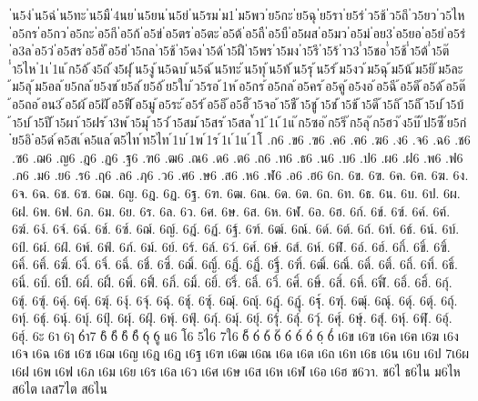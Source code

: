 {่น5ง่
่น5ฉ่
่น5ทะ
่น5มื
่4นย
่น5ยน
่น5ย่
่น5รม
่ม1
่ม5พว
่ย5กะ
่ย5ฉุ
่ย5รา
่ย5ร่
่ว5ช้
่ว5ถึ
่ว5ยว
่ว5ไห
่อ5กร
่อ5กว
่อ5กะ
่อ5กี
่อ5ก้
่อ5ข่
่อ5ตร
่อ5ตะ
่อ5ต้
่อ5ถื
่อ5บื
่อ5ผส
่อ5มว
่อ5ม่
่อย3
่อ5ยอ
่อ5ย่
่อ5ร่
่อ3ล
่อ5ว่
่อ5สร
่อ5ฮั
่อ5ฮ่
่า5กล
่า5ช้
่า5ดง
่า5ด้
่า5ฝื
่า5พร
่า5มง
่า5รึ
่า5ร้
่าว3
่ำ5ชอ
่ำ5ช้
่ำ5ต้
่ำ5ต๊
่ำ5ไห
่1เ
่1แ
้ก5อ้
้ง5ถ่
้ง5ฝุ
้น5งู
้น5ฉบ
้น5ฉ่
้น5ทะ
้น5ทุ
้น5ท้
้น5รุ
้น5ร่
้ม5งว
้ม5ฉุ
้ม5น้
้ม5ยิ
้ม5ละ
้ม5ลุ
้ม5อล
้ย5กล
้ย5งช
้ย5ล่
้ย5อ้
้ย5ใบ
้ว5รอ
้1ห
้อ5กร
้อ5กล
้อ5คร
้อ5คู
้อ5งอ
้อ5ฉี
้อ5ดึ
้อ5ด้
้อ5ต๊
้อ5ถอ
้อน3
้อ5ผ้
้อ5ฝั
้อ5ฟื
้อ5มู
้อ5ระ
้อ5ร่
้อ5อึ
้อ5ฮื
้า5จอ
้า5ชื
้า5ชู
้า5ช่
้า5ช้
้า5ดี
้า5ถิ
้า5ถึ
้า5บ่
้า5บ้
้า5บ๋
้า5ปี
้า5ผา
้า5ฝร
้า3พ
้า5มุ
้า5ว่
้า5สม
้า5สร
้า5สล
้ำ1
้1เ
้1แ
๊ก5ซอ
๊ก5ริ
๊ก5ลุ
๊ก5ฮว
๊ง5บ๊
๊ป5ซี
๊ย5ก่
๋ย5อิ
๋อ5ด๋
์ค5สเ
์ค5แล
์ต5ไท
์ท5ไท
์1บ
์1พ
์1ร
์1เ
์1แ
์1โ
.ก6
.ข6
.ฃ6
.ค6
.ฅ6
.ฆ6
.ง6
.จ6
.ฉ6
.ช6
.ซ6
.ฌ6
.ญ6
.ฎ6
.ฏ6
.ฐ6
.ฑ6
.ฒ6
.ณ6
.ด6
.ต6
.ถ6
.ท6
.ธ6
.น6
.บ6
.ป6
.ผ6
.ฝ6
.พ6
.ฟ6
.ภ6
.ม6
.ย6
.ร6
.ฤ6
.ล6
.ฦ6
.ว6
.ศ6
.ษ6
.ส6
.ห6
.ฬ6
.อ6
.ฮ6
6ก.
6ข.
6ฃ.
6ค.
6ฅ.
6ฆ.
6ง.
6จ.
6ฉ.
6ช.
6ซ.
6ฌ.
6ญ.
6ฎ.
6ฏ.
6ฐ.
6ฑ.
6ฒ.
6ณ.
6ด.
6ต.
6ถ.
6ท.
6ธ.
6น.
6บ.
6ป.
6ผ.
6ฝ.
6พ.
6ฟ.
6ภ.
6ม.
6ย.
6ร.
6ล.
6ว.
6ศ.
6ษ.
6ส.
6ห.
6ฬ.
6อ.
6ฮ.
6ก์.
6ข์.
6ฃ์.
6ค์.
6ฅ์.
6ฆ์.
6ง์.
6จ์.
6ฉ์.
6ช์.
6ซ์.
6ฌ์.
6ญ์.
6ฎ์.
6ฏ์.
6ฐ์.
6ฑ์.
6ฒ์.
6ณ์.
6ด์.
6ต์.
6ถ์.
6ท์.
6ธ์.
6น์.
6บ์.
6ป์.
6ผ์.
6ฝ์.
6พ์.
6ฟ์.
6ภ์.
6ม์.
6ย์.
6ร์.
6ล์.
6ว์.
6ศ์.
6ษ์.
6ส์.
6ห์.
6ฬ์.
6อ์.
6ฮ์.
6กิ์.
6ขิ์.
6ฃิ์.
6คิ์.
6ฅิ์.
6ฆิ์.
6งิ์.
6จิ์.
6ฉิ์.
6ชิ์.
6ซิ์.
6ฌิ์.
6ญิ์.
6ฎิ์.
6ฏิ์.
6ฐิ์.
6ฑิ์.
6ฒิ์.
6ณิ์.
6ดิ์.
6ติ์.
6ถิ์.
6ทิ์.
6ธิ์.
6นิ์.
6บิ์.
6ปิ์.
6ผิ์.
6ฝิ์.
6พิ์.
6ฟิ์.
6ภิ์.
6มิ์.
6ยิ์.
6ริ์.
6ลิ์.
6วิ์.
6ศิ์.
6ษิ์.
6สิ์.
6หิ์.
6ฬิ์.
6อิ์.
6ฮิ์.
6กุ์.
6ขุ์.
6ฃุ์.
6คุ์.
6ฅุ์.
6ฆุ์.
6งุ์.
6จุ์.
6ฉุ์.
6ชุ์.
6ซุ์.
6ฌุ์.
6ญุ์.
6ฎุ์.
6ฏุ์.
6ฐุ์.
6ฑุ์.
6ฒุ์.
6ณุ์.
6ดุ์.
6ตุ์.
6ถุ์.
6ทุ์.
6ธุ์.
6นุ์.
6บุ์.
6ปุ์.
6ผุ์.
6ฝุ์.
6พุ์.
6ฟุ์.
6ภุ์.
6มุ์.
6ยุ์.
6รุ์.
6ลุ์.
6วุ์.
6ศุ์.
6ษุ์.
6สุ์.
6หุ์.
6ฬุ์.
6อุ์.
6ฮุ์.
6ะ
6า
6ๅ
6ำ7
6ิ
6ี
6ึ
6ื
6ุ
6ู
แ6
โ6
5ไ6
7ใ6
6็
6่
6้
6๊
6๋
6์
6ํ
6ฺ
6๎
เ6ข
เ6ฃ
เ6ค
เ6ฅ
เ6ฆ
เ6ง
เ6จ
เ6ฉ
เ6ช
เ6ซ
เ6ฌ
เ6ญ
เ6ฎ
เ6ฏ
เ6ฐ
เ6ฑ
เ6ฒ
เ6ณ
เ6ด
เ6ต
เ6ถ
เ6ท
เ6ธ
เ6น
เ6บ
เ6ป
7เ6ผ
เ6ฝ
เ6พ
เ6ฟ
เ6ภ
เ6ม
เ6ย
เ6ร
เ6ล
เ6ว
เ6ศ
เ6ษ
เ6ส
เ6ห
เ6ฬ
เ6อ
เ6ฮ
ช6วา.
ช6ไ
ธ6ไน
ม6ไห
ส6ไต
เลส7ไต
ส6ไน
}
